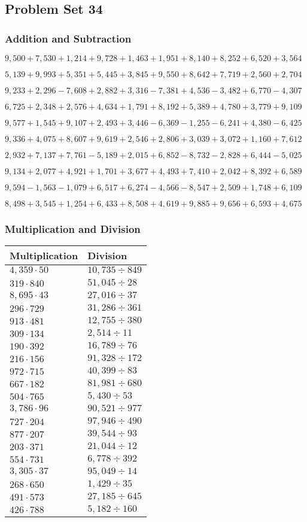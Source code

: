 \hypertarget{problem-set-34-3}{%
\subsection{Problem Set 34}\label{problem-set-34-3}}

\hypertarget{addition-and-subtraction-196}{%
\subsubsection{Addition and
Subtraction}\label{addition-and-subtraction-196}}

\(9,500+7,530+1,214+9,728+1,463+1,951+8,140+8,252+6,520+ 3,564\)

\(5,139+9,993+5,351+5,445+3,845+9,550+8,642+7,719+2,560+2,704\)

\(9,233+2,296-7,608+2,882+3,316-7,381+4,536-3,482+6,770-4,307\)

\(6,725+2,348+2,576+4,634+1,791+8,192+5,389+4,780+3,779+9,109\)

\(9,577+1,545+9,107+2,493+3,446-6,369-1,255-6,241+4,380-6,425\)

\(9,336+4,075+8,607+9,619+2,546+2,806+3,039+3,072+1,160+7,612\)

\(2,932+7,137+7,761-5,189+2,015+6,852-8,732-2,828+6,444-5,025\)

\(9,134+2,077+4,921+1,701+3,677+4,493+7,410+2,042+8,392+6,589\)

\(9,594-1,563-1,079+6,517+6,274-4,566-8,547+2,509+1,748+6,109\)

\(8,498+3,545+1,254+6,433+8,508+4,619+9,885+9,656+6,593+4,675\)

\hypertarget{multiplication-and-division-195}{%
\subsubsection{Multiplication and
Division}\label{multiplication-and-division-195}}

\begin{longtable}[]{@{}ll@{}}
\toprule
Multiplication & Division\tabularnewline
\midrule
\endhead
\(4,359\cdot50\) & \(10,735÷849\)\tabularnewline
\(319\cdot840\) & \(51,045÷28\)\tabularnewline
\(8,695\cdot43\) & \(27,016÷37\)\tabularnewline
\(296\cdot729\) & \(31,286÷361\)\tabularnewline
\(913\cdot481\) & \(12,755÷380\)\tabularnewline
\(309\cdot134\) & \(2,514÷11\)\tabularnewline
\(190\cdot392\) & \(16,789÷76\)\tabularnewline
\(216\cdot156\) & \(91,328÷172\)\tabularnewline
\(972\cdot715\) & \(40,399÷83\)\tabularnewline
\(667\cdot182\) & \(81,981÷680\)\tabularnewline
\(504\cdot765\) & \(5,430÷53\)\tabularnewline
\(3,786\cdot96\) & \(90,521÷977\)\tabularnewline
\(727\cdot204\) & \(97,946÷490\)\tabularnewline
\(877\cdot207\) & \(39,544÷93\)\tabularnewline
\(203\cdot371\) & \(21,044÷12\)\tabularnewline
\(554\cdot731\) & \(6,778÷392\)\tabularnewline
\(3,305\cdot37\) & \(95,049÷14\)\tabularnewline
\(268\cdot650\) & \(1,429÷35\)\tabularnewline
\(491\cdot573\) & \(27,185÷645\)\tabularnewline
\(426\cdot788\) & \(5,182÷160\)\tabularnewline
\bottomrule
\end{longtable}

